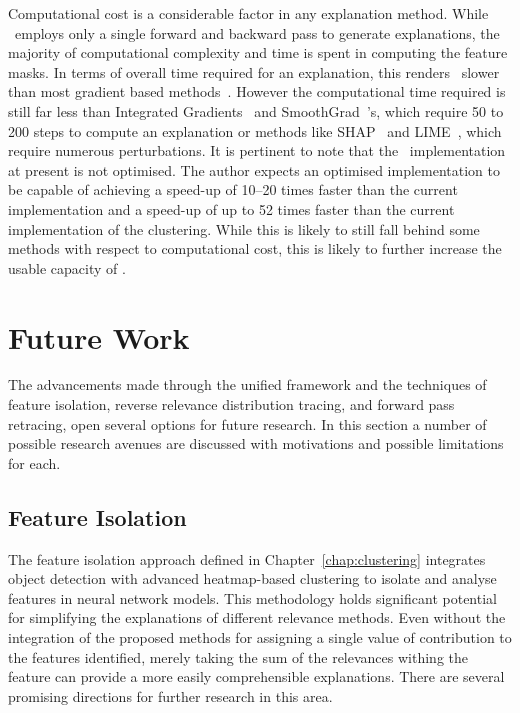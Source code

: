 Computational cost is a considerable factor in any explanation method. While \CTC\ employs only a single forward and backward pass to generate explanations, the majority of computational complexity and time is spent in computing the feature masks. In terms of overall time required for an explanation, this renders \CTC\ slower than most gradient based methods~\cite{SimonyanVZ13, SimonyanVZ13, SpringenbergDBR14, bach2015pixel, SelvarajuCDVPB20, SelvarajuCDVPB20, ChattopadhyaySH18, abs-1908-01224, SmilkovTKVW17}. However the computational time required is still far less than Integrated Gradients~\cite{SundararajanTY17} and SmoothGrad~\cite{SmilkovTKVW17}'s, which require 50 to 200 steps to compute an explanation or methods like SHAP~\cite{LundbergL17} and LIME~\cite{Ribeiro0G16}, which require numerous perturbations. It is pertinent to note that the \CTC\ implementation at present is not optimised. The author expects an optimised implementation to be capable of achieving a speed-up of 10--20 times faster than the current implementation and a speed-up of up to 52 times faster than the current implementation of the clustering. While this is likely to still fall behind some methods with respect to computational cost, this is likely to further increase the usable capacity of \CTC.

\section{Future Work}
The advancements made through the unified framework and the techniques of feature isolation, reverse relevance distribution tracing, and forward pass retracing, open several options for future research. In this section a number of possible research avenues are discussed with motivations and possible limitations for each.

\subsection{Feature Isolation}
The feature isolation approach defined in Chapter~\ref{chap:clustering} integrates object detection with advanced heatmap-based clustering to isolate and analyse features in neural network models. This methodology holds significant potential for simplifying the explanations of different relevance methods. Even without the integration of the proposed methods for assigning a single value of contribution to the features identified, merely taking the sum of the relevances withing the feature can provide a more easily comprehensible explanations. There are several promising directions for further research in this area.

